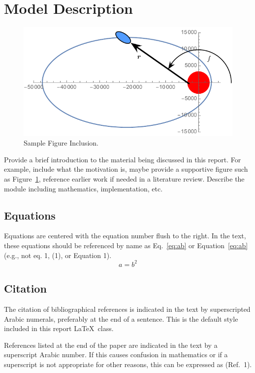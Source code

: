 \section{Model Description}

\begin{figure}[H]
	\centerline{
		\includegraphics{Figures/Fig1}
	}
	\caption{Sample Figure Inclusion.}
	\label{fig:Fig1}
\end{figure}

Provide a brief introduction to the material being discussed in this report.  For example, include what the motivation is, maybe provide a supportive figure such as Figure~\ref{fig:Fig1}, reference earlier work if needed in a literature review.
Describe the module including mathematics, implementation, etc.

\subsection{Equations}
Equations are centered with the equation number flush to the right. In the text, these equations should be referenced by name as Eq.~\eqref{eq:ab} or Equation~\eqref{eq:ab} (e.g., not eq.  1, (1), or Equation 1).
\begin{equation}
	\label{eq:ab}
	a = b^{2}
\end{equation}

\subsection{Citation}
The citation of bibliographical references is indicated in the text by superscripted Arabic numerals, preferably at the end of a sentence.  This is the default style included in this report \LaTeX\ class.

References listed at the end of the paper are indicated in the text by a superscript Arabic number. If this causes confusion in mathematics or if a superscript is not appropriate for other reasons, this can be expressed as (Ref.~1). 

